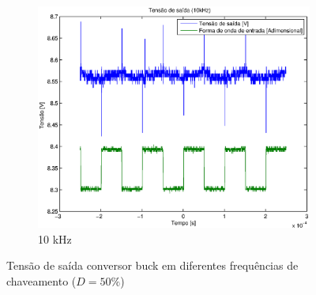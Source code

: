 \documentclass{article}
\begin{document}
\begin{figure}[H]
\begin{subfigure}[b]{0.3\textwidth}
		\includegraphics[width=\textwidth]{Dados/buck/t10k}
		\caption{10 kHz}
	\end{subfigure}
	\caption{Tensão de saída conversor buck em diferentes frequências de chaveamento ($D=50\%$)}
	\label{fig:but}
\end{figure}
\end{document}
